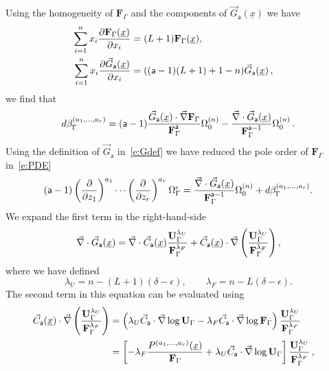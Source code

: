 \documentclass[a4paper,12pt]{article}
\numberwithin{equation}{section}
\numberwithin{figure}{section}
\begin{document}
Using the homogeneity of $\mathbf{F}_\Gamma$ and the
components of $\vec G_{\mathsf{a}}(\underline x)$ we have
\begin{align}
  \sum_{i=1}^n x_i {\partial\mathbf{F}_\Gamma (\underline x)\over \partial x_i}&=
                                                                  (L+1) \mathbf{F}_\Gamma (\underline x),\cr
   \sum_{i=1}^n x_i {\partial\vec G_{\mathsf{a}}(\underline x)\over \partial x_i}&=
                                                                  ((\mathsf{a}-1)(L+1)+1-n) \vec G_{\mathsf{a}}(\underline x) \,,
\end{align}
we find that 
   \begin{equation}
     d\beta_\Gamma^{(a_1,\dots,a_r)}= (\mathsf{a}-1) {  \vec  G_{\mathsf{a}}
     (\underline x)
\cdot    \vec \nabla\textbf{F}_\Gamma\over
     \textbf{F}_\Gamma^{\mathsf{a}}}\Omega_0^{(n)}-{
\vec\nabla \cdot \vec G_{\mathsf{a}}
     (\underline x)
    \over
   \textbf{F}_\Gamma^{\mathsf{a}-1}}
  \Omega_0^{(n)} \,.
\end{equation}
Using the definition of $\vec  G_{\mathsf{a}}$ in~\eqref{e:Gdef} we
have reduced the pole order  of $ \textbf{F}_\Gamma$ in~\eqref{e:PDE} 
\begin{equation}\label{e:RedG1}
 (\mathsf{a}-1)\left(\partial\over \partial z_1\right)^{a_1}\cdots\left(\partial
  \over\partial z_r\right)^{a_r} \Omega_\Gamma^\epsilon={
\vec\nabla \cdot \vec G_{\mathsf{a}}
     (\underline x)
    \over
  \textbf{F}_\Gamma^{\mathsf{a}-1}}
  \Omega_0^{(n)}+d\beta_\Gamma^{(a_1,\dots,a_r)}.
\end{equation}
%
We expand the first term in the right-hand-side
\begin{equation}
  \vec\nabla \cdot \vec G_{\mathsf{a}}(\underline x)=  \vec\nabla \cdot \vec C_{\mathsf{a}}(\underline x) {\textbf{U}_\Gamma^{\lambda_U}\over
  \textbf{F}_\Gamma^{\lambda_F}} 
+
  \vec C_{\mathsf{a}}(\underline x) \cdot\vec\nabla  \left(   {\textbf{U}_\Gamma^{\lambda_U}\over
  \textbf{F}_\Gamma^{\lambda_F}} \right),
\end{equation}
where we have defined
\begin{equation}\label{e:powerUFDef}
  \lambda_U=n-(L+1)(\delta-\epsilon), \qquad 
  \lambda_F=n-L(\delta-\epsilon).
  \end{equation}
%
The second term in this equation can be evaluated using 
\begin{align}
  \vec C_{\mathsf{a}}(\underline x)\cdot \vec\nabla \left(\mathbf{U}_\Gamma^{\lambda_U}\over
\mathbf{F}_\Gamma^{\lambda_F}\right)&=\left(\lambda_U \vec
C_{\mathsf{a}}\cdot \vec\nabla \log\mathbf{U}_\Gamma -{\lambda_F} \vec
C_{\mathsf{a}}\cdot \vec\nabla \log \mathbf{F}_\Gamma\right) {\mathbf{U}_\Gamma^{\lambda_U}\over
\mathbf{F}_\Gamma^{\lambda_F}} \cr
&=\left[-{\lambda_F}{
    P^{(a_1,\dots,a_r)}(\underline x)\over
  \mathbf{F}_\Gamma}   
+
 \lambda_U \vec
C_{\mathsf{a}}\cdot \vec\nabla \log\mathbf{U}_\Gamma \right] {\mathbf{U}_\Gamma^{\lambda_U}\over
	\mathbf{F}_\Gamma^{\lambda_F}}\,,
\end{align}
\end{document}
